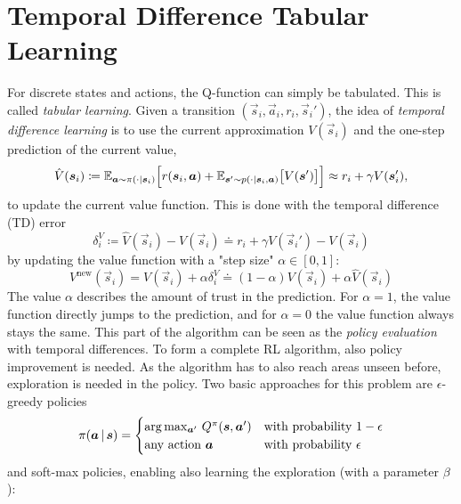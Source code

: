 	\section{Temporal Difference Tabular Learning}
		For discrete states and actions, the Q-function can simply be tabulated. This is called \emph{tabular learning}. Given a transition \( (\vec{s}_i, \vec{a}_i, r_i, \vec{s}_i') \), the idea of \emph{temporal difference learning} is to use the current approximation \( V(\vec{s}_i) \) and the one-step prediction of the current value,
		\begin{equation*}
			\hat{V}(\bm{s}_i) \coloneqq \mathbb{E}_{\bm{a} \sim \pi(\cdot \vert \bm{s}_i)} \Big[ r(\bm{s}_i, \bm{a}) + \mathbb{E}_{\bm{s}' \sim p(\cdot \vert \bm{s}_i, \bm{a})}\big[ V(\bm{s}') \big] \Big] \approx r_i + \gamma V(\bm{s}_i'),
		\end{equation*}
		to update the current value function. This is done with the temporal difference (TD) error
		\begin{equation}
			\delta_i^V \coloneqq \hat{V}(\vec{s}_i) - V(\vec{s}_i) \doteq r_i + \gamma V(\vec{s}_i') - V(\vec{s}_i)  \label{eq:tdVError}
		\end{equation}
		by updating the value function with a "step size" \( \alpha \in [0, 1] \):
		\begin{equation}
			V^\mathrm{new}(\vec{s}_i) = V(\vec{s}_i) + \alpha \delta_i^V \doteq (1 - \alpha) V(\vec{s}_i) + \alpha \hat{V}(\vec{s}_i)  \label{eq:tdVFunction}
		\end{equation}
		The value \(\alpha\) describes the amount of trust in the prediction. For \(\alpha = 1\), the value function directly jumps to the prediction, and for \(\alpha = 0\) the value function always stays the same. This part of the algorithm can be seen as the \emph{policy evaluation} with temporal differences. To form a complete RL algorithm, also policy improvement is needed. As the algorithm has to also reach areas unseen before, exploration is needed in the policy. Two basic approaches for this problem are \(\epsilon\)-greedy policies
		\begin{equation*}
			\pi(\bm{a} \,\vert\, \bm{s}) =
			\begin{cases}
				\arg\max_{\bm{a}'} \, Q^\pi(\bm{s}, \bm{a}') & \text{with probability } 1 - \epsilon \\
				\text{any action } \bm{a}                      & \text{with probability } \epsilon
			\end{cases}
		\end{equation*}
		and soft-max policies, enabling also learning the exploration (with a parameter \(\beta\)):
